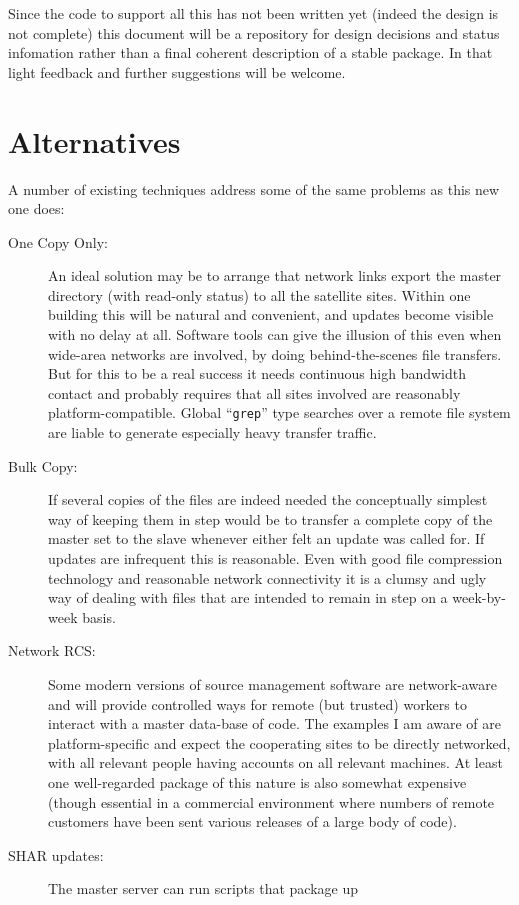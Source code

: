 Since the code to support all this has not been written yet (indeed the
design is not complete) this document will be a repository for design
decisions and status infomation rather than a final coherent description
of a stable package. In that light feedback and further suggestions will
be welcome.

\section{Alternatives}
A number of existing techniques address some of the same problems as
this new one does:
\begin{description}
\item[One Copy Only:] An ideal solution may be to arrange that network links
export the master directory (with read-only status) to all the satellite
sites. Within one building this will be natural and convenient,
and updates become visible with no delay at all. Software tools can
give the illusion of this even when wide-area networks are involved, by
doing behind-the-scenes file transfers. But for this to be a real
success it needs continuous high bandwidth contact and probably requires
that all sites involved are reasonably platform-compatible. Global
``{\tt grep}'' type searches over a remote file system are liable to
generate especially heavy transfer traffic.
\item[Bulk Copy:] If several copies of the files are indeed
needed the  conceptually simplest way of keeping them in step would be
to transfer a complete copy of the master set to the slave whenever either
felt an update was called for.
If updates are infrequent this is reasonable. Even with good file compression
technology and reasonable network connectivity it is a clumsy and ugly way of
dealing with files that are intended to remain in step on a week-by-week basis.
\item[Network RCS:] Some modern versions of source management software
are network-aware and will provide controlled ways for remote (but trusted)
workers to interact with a master data-base of code. The examples I am
aware of are platform-specific and expect the cooperating sites to be
directly networked, with all relevant people having accounts on all
relevant machines. At least one well-regarded package of this nature is
also somewhat expensive (though essential in a commercial environment
where numbers of remote customers have been sent various releases of
a large body of code).
\item[SHAR updates:] The master server can run scripts that package up

\end{description}
